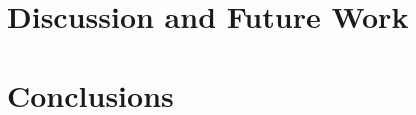 \documentclass[0-suturing.tex]{subfiles}
\begin{document}
\section{Discussion and Future Work}
\label{sec:discussion}


\section{Conclusions}
\label{sec:conclusion}
\end{document}
